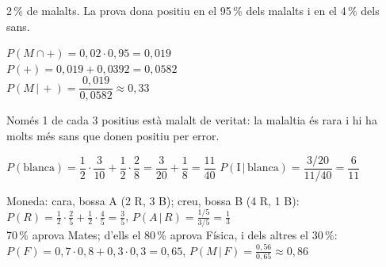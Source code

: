\documentclass[11pt,a4paper]{article}
\newcommand{\heavy}{\fontseries{eb}\selectfont}
\newcommand{\cond}{\,|\,}
\begin{document}
\vfill
\begin{exemple}
{\small 2\,\% de malalts. La prova dona positiu en el 95\,\% dels malalts i en el 4\,\% dels sans.}\par\smallskip
\begin{minipage}[c]{0.5\linewidth}\centering
{}
\end{minipage}\hfill
\begin{minipage}[c]{0.48\linewidth}
$P(M\cap+)=0{,}02\cdot0{,}95=0{,}019$\\[4pt]
$P(+)=0{,}019+0{,}0392=\boxed{0{,}0582}$\\[4pt]
$P(M\cond+)=\dfrac{0{,}019}{0{,}0582}\approx\boxed{0{,}33}$
\end{minipage}
\end{exemple}

\vfill
\begin{compte}[Sorprenent!]
Només 1 de cada 3 positius està malalt de veritat: la malaltia és rara i hi ha molts més sans que donen positiu per error.
\end{compte}

\vfill
\begin{exemple}
$P(\text{blanca})=\dfrac12\cdot\dfrac3{10}+\dfrac12\cdot\dfrac28=\dfrac3{20}+\dfrac18=\boxed{\dfrac{11}{40}}$ \qquad $P(\text{I}\cond\text{blanca})=\dfrac{3/20}{11/40}=\boxed{\dfrac6{11}}$
\end{exemple}

\vfill
\begin{exemple}[Exemples]
Moneda: cara, bossa A (2 R, 3 B); creu, bossa B (4 R, 1 B): \ \\ \hspace*{1em}$P(R)=\frac12\cdot\frac25+\frac12\cdot\frac45=\frac35$, \quad $P(A\cond R)=\frac{1/5}{3/5}=\frac13$\\[4pt]
70\,\% aprova Mates; d'ells el 80\,\% aprova Física, i dels altres el 30\,\%:\\ \hspace*{1em}$P(F)=0{,}7\cdot0{,}8+0{,}3\cdot0{,}3=0{,}65$, \quad $P(M\cond F)=\frac{0{,}56}{0{,}65}\approx0{,}86$
\end{exemple}
\end{document}
